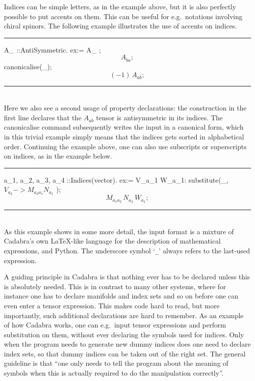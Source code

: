 \documentclass[11pt]{article}
\newcommand{\toprule}{\par\vspace{1ex}\noindent\hspace{25pt}\rule{435pt}{.1pt}}
\newcommand{\botrule}{\noindent\hspace{25pt}\rule{435pt}{.1pt}\\[2ex]}
\newenvironment{cdbin}{\fvset{firstnumber=1}\color[named]{Blue}\Verbatim}{\endVerbatim}
\newenvironment{cdbcont}{\fvset{firstnumber=last}\color[named]{Blue}\Verbatim}{\endVerbatim}
\newenvironment{cdbout}{\vspace{-1.4ex}\begin{equation}}{\end{equation}\vspace{-1.4ex}}
\newcommand{\Cdb}{{Cadabra}\xspace}
\begin{document}
Indices can be simple letters, as in the example above, but it is also
perfectly possible to put accents on them. This can be useful for
e.g.~notations involving chiral spinors. The following example
illustrates the use of accents on indices.
\toprule
\begin{cdbin}
A_{ }::AntiSymmetric.
ex:= A_{ };
\end{cdbin}
\begin{cdbout}
A_{\dot{b} \dot{a}};
\end{cdbout}
\begin{cdbcont}
canonicalise(_);
\end{cdbcont}
\begin{cdbout}
(-1)\,A_{\dot{a} \dot{b}};
\end{cdbout}
\botrule Here we also see a second usage of property declarations: the
construction in the first line declares that the $A_{\dot{a} \dot{b}}$
tensor is antisymmetric in its indices. The canonicalise command
subsequently writes the input in a canonical form, which in this
trivial example simply means that the indices gets sorted in
alphabetical order.  Continuing the example above, one can also use
subscripts or superscripts on indices, as in the example below.
\vfill\eject
\toprule
\begin{cdbin}
{ a_{1}, a_{2}, a_{3}, a_{4} }::Indices(vector).
ex:= V_{a_{1}} W_{a_{1}}:
substitute(_, $V_{a_{2}} -> M_{a_{2} a_{1}} N_{a_{1}}$ );
\end{cdbin}
\begin{cdbout}
M_{a_{1} a_{2}} \, N_{a_{2}} \, W_{a_{1}};
\end{cdbout}
\botrule As this example shows in some more detail, the input format
is a mixture of Cadabra's own LaTeX-like language for the description
of mathematical expressions, and Python. The underscore symbol
`\verb|_|' always refers to the last-used expression.

A guiding principle in \Cdb is that nothing ever has to be declared
unless this is absolutely needed. This is in contrast to many other
systems, where for instance one has to declare manifolds and index
sets and so on before one can even enter a tensor expression. This
makes code hard to read, but more importantly, such additional
declarations are hard to remember. As an example of how \Cdb works,
one can e.g.~input tensor expressions and perform substitution on them,
without ever declaring the symbols used for indices. Only when the
program needs to generate new dummy indices does one need to declare
index sets, so that dummy indices can be taken out of the right
set. The general guideline is that ``one only
needs to tell the program about the meaning of symbols when this is
actually required to do the manipulation correctly''.
\end{document}

